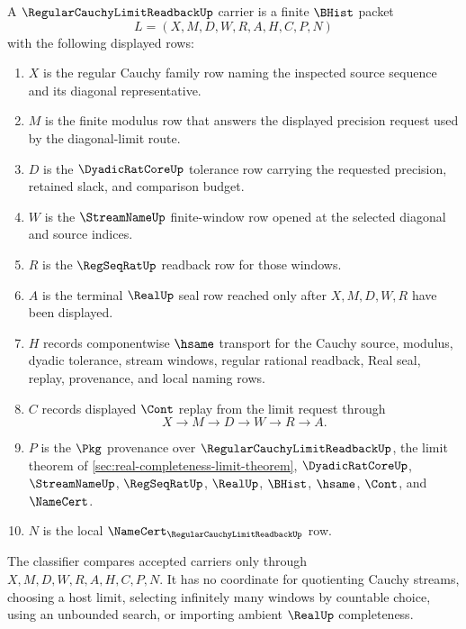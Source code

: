 \begin{definition}
\label{def:regular-cauchy-limit-readback-carrier}
A $\RegularCauchyLimitReadbackUp$ carrier is a finite $\BHist$ packet
$$
L=(X,M,D,W,R,A,H,C,P,N)
$$
with the following displayed rows:
\begin{enumerate}
\item $X$ is the regular Cauchy family row naming the inspected source sequence and its diagonal representative.
\item $M$ is the finite modulus row that answers the displayed precision request used by the diagonal-limit route.
\item $D$ is the $\DyadicRatCoreUp$ tolerance row carrying the requested precision, retained slack, and comparison budget.
\item $W$ is the $\StreamNameUp$ finite-window row opened at the selected diagonal and source indices.
\item $R$ is the $\RegSeqRatUp$ readback row for those windows.
\item $A$ is the terminal $\RealUp$ seal row reached only after $X,M,D,W,R$ have been displayed.
\item $H$ records componentwise $\hsame$ transport for the Cauchy source, modulus, dyadic tolerance, stream windows, regular rational readback, Real seal, replay, provenance, and local naming rows.
\item $C$ records displayed $\Cont$ replay from the limit request through
$$
X\longrightarrow M\longrightarrow D\longrightarrow W\longrightarrow R\longrightarrow A .
$$
\item $P$ is the $\Pkg$ provenance over $\RegularCauchyLimitReadbackUp$, the limit theorem of \autoref{sec:real-completeness-limit-theorem}, $\DyadicRatCoreUp$, $\StreamNameUp$, $\RegSeqRatUp$, $\RealUp$, $\BHist$, $\hsame$, $\Cont$, and $\NameCert$.
\item $N$ is the local $\NameCert_{\RegularCauchyLimitReadbackUp}$ row.
\end{enumerate}
The classifier compares accepted carriers only through $X,M,D,W,R,A,H,C,P,N$. It has no coordinate for quotienting Cauchy streams, choosing a host limit, selecting infinitely many windows by countable choice, using an unbounded search, or importing ambient $\RealUp$ completeness.
\end{definition}

